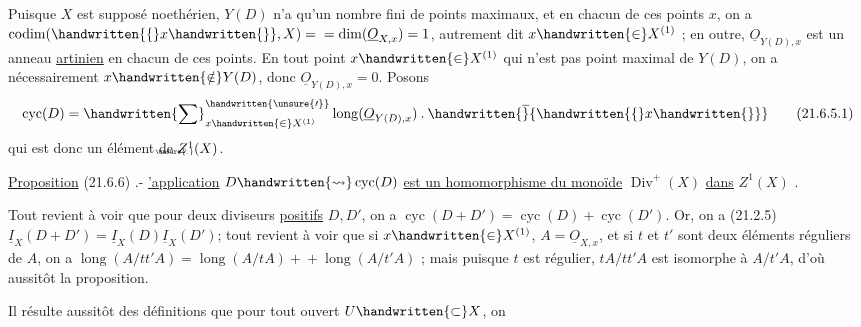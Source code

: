 Puisque $X$ est supposé noethérien, $Y(D)$ n'a qu'un nombre fini de points maximaux, et en chacun de ces points $x$, on a $\operatorname{codim}(\handwritten{\{}x\handwritten{\}},X)={}\allowbreak{}=\operatorname{dim}(\underline O_{X,x})=1$, autrement dit $x\handwritten{\in}X^{(1)}$ ;
\normalmarginpar
{} en outre, $\underline O_{Y(D),x}$ est un anneau \uline{artinien} en chacun de ces points. En tout point $x\handwritten{\in}X^{(1)}$ qui n'est pas point maximal de $Y(D)$, on a nécessairement $x\handwritten{\notin}Y(D)$, donc $\underline O_{Y(D),x}=0$. Posons
\[
  \operatorname{cyc}(D)=\handwritten{\sum}^{\handwritten{\unsure{\prime}}}_{x\handwritten{\in}X^{(1)}}
  \operatorname{long}(\underline O_{Y(D),x})\mathbin{.}\handwritten{\overline}{\handwritten{\{}x\handwritten{\}}}
  \tag*{(21.6.5.1)}
\]
qui est donc un élément de $Z^{1}\llap{\raisebox{-.12ex}[0pt][0pt]{\tiny\unsure{.}}}(X)$.

\uline{Proposition} (21.6.6) .-  \uline{'application} $D\handwritten{\leadsto}\operatorname{cyc}(D)$\deleted{\unsure{;}} \uline{est un homomorphisme du monoïde} $\operatorname{Div}^{+}(X)$ \uline{dans} $Z^{1}(X)$ .

Tout revient à voir que pour deux diviseurs \uline{positifs} $D,D'$, on a $\operatorname{cyc}(D+D')=\operatorname{cyc}(D)+\operatorname{cyc}(D')$. Or, on a (21.2.5) $\underline I_{X}(D+D')=\underline I_{X}(D)\underline I_{X}(D')$; tout revient à voir que si $x\handwritten{\in}X^{(1)}$,  $A=\underline O_{X,x}$, et si $t$ et $t'$ sont deux éléments réguliers de $A$, on a $\operatorname{long}(A/tt'A)=\operatorname{long}(A/tA)+{}\allowbreak{}+\operatorname{long}(A/t'A)$ ; mais puisque  $t$ est régulier, $tA/tt'A$ est isomorphe à $A/t'A$, d'où  aussitôt la proposition.

Il résulte aussitôt des définitions que pour tout ouvert $U\handwritten{\subset}X$, on
